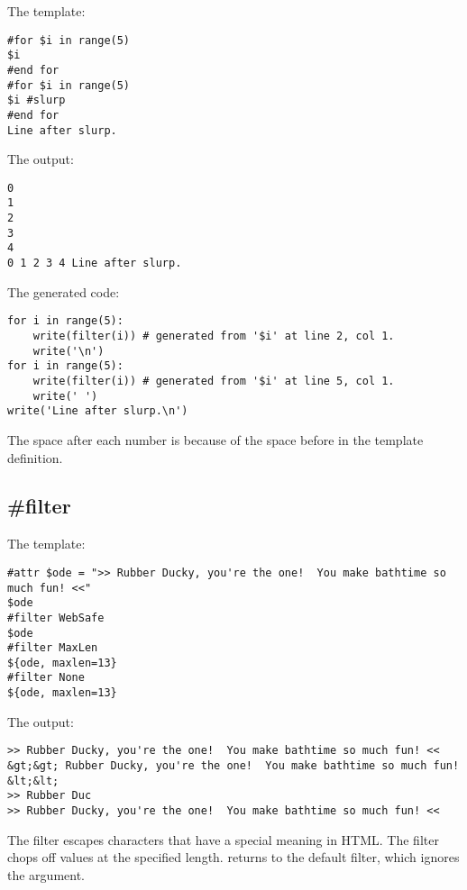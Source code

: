 The template:
\begin{verbatim}
#for $i in range(5)
$i
#end for
#for $i in range(5)
$i #slurp
#end for
Line after slurp.
\end{verbatim}

The output:
\begin{verbatim}
0
1
2
3
4
0 1 2 3 4 Line after slurp.
\end{verbatim}

The generated code:
\begin{verbatim}
for i in range(5):
    write(filter(i)) # generated from '$i' at line 2, col 1.
    write('\n')
for i in range(5):
    write(filter(i)) # generated from '$i' at line 5, col 1.
    write(' ')
write('Line after slurp.\n')
\end{verbatim}

The space after each number is because of the space before  in 
the template definition.

\subsection{\#filter}
\label{output.filter}

The template:
\begin{verbatim}
#attr $ode = ">> Rubber Ducky, you're the one!  You make bathtime so much fun! <<"
$ode
#filter WebSafe
$ode
#filter MaxLen
${ode, maxlen=13}
#filter None
${ode, maxlen=13}
\end{verbatim}

The output:
\begin{verbatim}
>> Rubber Ducky, you're the one!  You make bathtime so much fun! <<
&gt;&gt; Rubber Ducky, you're the one!  You make bathtime so much fun! &lt;&lt;
>> Rubber Duc
>> Rubber Ducky, you're the one!  You make bathtime so much fun! <<
\end{verbatim}

The  filter escapes characters that have a special meaning in 
HTML.  The  filter chops off values at the specified length.
 returns to the default filter, which ignores the 
argument.

